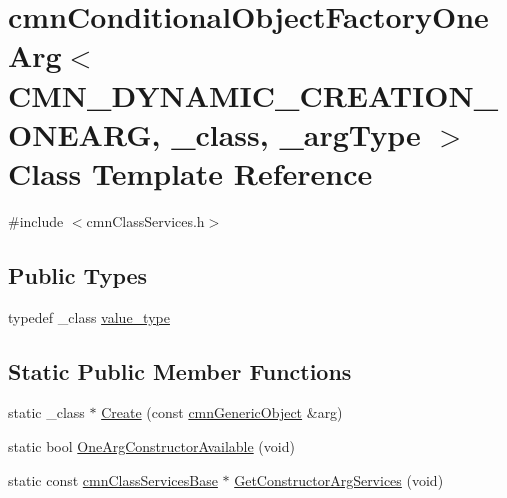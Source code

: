 \hypertarget{classcmn_conditional_object_factory_one_arg_3_01_c_m_n___d_y_n_a_m_i_c___c_r_e_a_t_i_o_n___o_n_ede9b022187ff72195baf5864ecd7352d}{}\section{cmn\+Conditional\+Object\+Factory\+One\+Arg$<$ C\+M\+N\+\_\+\+D\+Y\+N\+A\+M\+I\+C\+\_\+\+C\+R\+E\+A\+T\+I\+O\+N\+\_\+\+O\+N\+E\+A\+R\+G, \+\_\+class, \+\_\+arg\+Type $>$ Class Template Reference}
\label{classcmn_conditional_object_factory_one_arg_3_01_c_m_n___d_y_n_a_m_i_c___c_r_e_a_t_i_o_n___o_n_ede9b022187ff72195baf5864ecd7352d}


{\ttfamily \#include $<$cmn\+Class\+Services.\+h$>$}

\subsection*{Public Types}
\begin{DoxyCompactItemize}
\item 
typedef \+\_\+class \hyperlink{classcmn_conditional_object_factory_one_arg_3_01_c_m_n___d_y_n_a_m_i_c___c_r_e_a_t_i_o_n___o_n_ede9b022187ff72195baf5864ecd7352d_a33029699c2ed3d54426007bf39dd777c}{value\+\_\+type}
\end{DoxyCompactItemize}
\subsection*{Static Public Member Functions}
\begin{DoxyCompactItemize}
\item 
static \+\_\+class $\ast$ \hyperlink{classcmn_conditional_object_factory_one_arg_3_01_c_m_n___d_y_n_a_m_i_c___c_r_e_a_t_i_o_n___o_n_ede9b022187ff72195baf5864ecd7352d_a4eb48e1f753d88c15a1417423abd9b57}{Create} (const \hyperlink{classcmn_generic_object}{cmn\+Generic\+Object} \&arg)
\item 
static bool \hyperlink{classcmn_conditional_object_factory_one_arg_3_01_c_m_n___d_y_n_a_m_i_c___c_r_e_a_t_i_o_n___o_n_ede9b022187ff72195baf5864ecd7352d_a979e084e1210d3a3b781740aad77d175}{One\+Arg\+Constructor\+Available} (void)
\item 
static const \hyperlink{classcmn_class_services_base}{cmn\+Class\+Services\+Base} $\ast$ \hyperlink{classcmn_conditional_object_factory_one_arg_3_01_c_m_n___d_y_n_a_m_i_c___c_r_e_a_t_i_o_n___o_n_ede9b022187ff72195baf5864ecd7352d_a815deefce508160beb3e1c2a65993227}{Get\+Constructor\+Arg\+Services} (void)
\end{DoxyCompactItemize}



